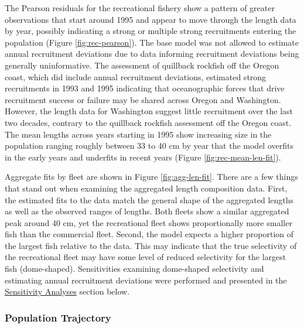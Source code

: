 \documentclass[11pt,
  english,
  letterpaper,
]{article}
\begin{document}
The Pearson residuals for the recreational fishery show a pattern of greater observations that start around 1995 and appear to move through the length data by year, possibly indicating a strong or multiple strong recruitments entering the population (Figure \ref{fig:rec-pearson}). The base model was not allowed to estimate annual recruitment deviations due to data informing recruitment deviations being generally uninformative. The assessment of quillback rockfish off the Oregon coast, which did include annual recruitment deviations, estimated strong recruitments in 1993 and 1995 indicating that oceanographic forces that drive recruitment success or failure may be shared across Oregon and Washington. However, the length data for Washington suggest little recruitment over the last two decades, contrary to the quillback rockfish assessment off the Oregon coast. The mean lengths across years starting in 1995 show increasing size in the population ranging roughly between 33 to 40 cm by year that the model overfits in the early years and underfits in recent years (Figure \ref{fig:rec-mean-len-fit}).

\leavevmode\tagmcend\tagstructend\par


Aggregate fits by fleet are shown in Figure \ref{fig:agg-len-fit}. There are a few things that stand out when examining the aggregated length composition data. First, the estimated fits to the data match the general shape of the aggregated lengths as well as the observed ranges of lengths. Both fleets show a similar aggregated peak around 40 cm, yet the recreational fleet shows proportionally more smaller fish than the commercial fleet. Second, the model expects a higher proportion of the largest fish relative to the data. This may indicate that the true selectivity of the recreational fleet may have some level of reduced selectivity for the largest fish (dome-shaped). Sensitivities examining dome-shaped selectivity and estimating annual recruitment deviations were performed and presented in the {\protect\hyperlink{sensitivity-analyses}{Sensitivity Analyses}\leavevmode\tagmcend\tagstructend} section below.

\leavevmode\tagmcend\tagstructend\par


\hypertarget{population-trajectory}{%
\subsubsection{Population Trajectory}\label{population-trajectory}}
\end{document}

